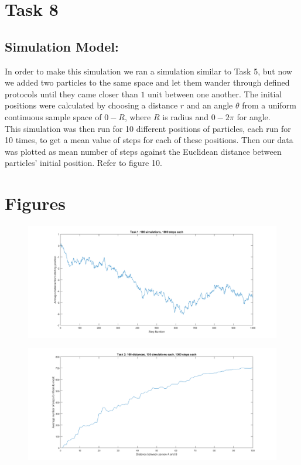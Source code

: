 \documentclass[10pt, a4paper]{article}
\begin{document}
\section*{Task 8}
\subsection*{Simulation Model:}
In order to make this simulation we ran a simulation similar to Task 5, but now we added two particles to the same space and let them wander through defined protocols until they came closer than $1$ unit between one another. The initial positions were calculated by choosing a distance $r$ and an angle $\theta$ from a uniform continuous sample space of $0-R$, where $R$ is radius and $0-2\pi$ for angle.\\
This simulation was then run for 10 different positions of particles, each run for 10 times, to get a mean value of steps for each of these positions. Then our data was plotted as mean number of steps against the Euclidean distance between particles' initial position.
Refer to figure 10.

\newpage

\section*{Figures}

\begin{figure}[H]
    \includegraphics[width=\textwidth]{Diagrams/Task 1 Testing/100 simulations, 1000 steps/graph.png}
    \caption{}
    \label{fig:1}    
  \end{figure}

\begin{figure}[H]
    \includegraphics[width=\textwidth]{Diagrams/Task 2 Testing/ureka.png}
    \caption{}
    \label{fig:2}
\end{figure}
\end{document}
